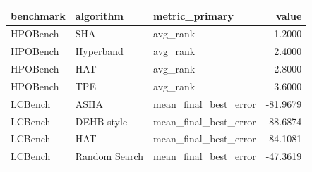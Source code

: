\begin{tabular}{lllr}
\toprule
benchmark & algorithm & metric_primary & value \\
\midrule
HPOBench & SHA & avg_rank & 1.2000 \\
HPOBench & Hyperband & avg_rank & 2.4000 \\
HPOBench & HAT & avg_rank & 2.8000 \\
HPOBench & TPE & avg_rank & 3.6000 \\
LCBench & ASHA & mean_final_best_error & -81.9679 \\
LCBench & DEHB-style & mean_final_best_error & -88.6874 \\
LCBench & HAT & mean_final_best_error & -84.1081 \\
LCBench & Random Search & mean_final_best_error & -47.3619 \\
\bottomrule
\end{tabular}
